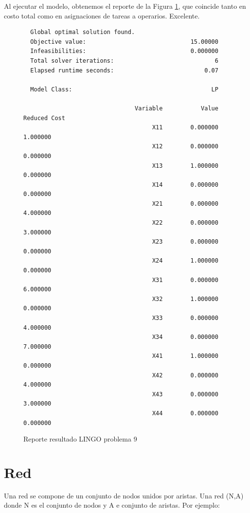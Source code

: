 \documentclass[12pt]{article}  %
\begin{document}
Al ejecutar el modelo, obtenemos el reporte de la Figura \ref{fig:reporteProb9}, que coincide tanto en costo total como en asignaciones de tareas a operarios. Excelente.

\begin{figure}[H]
	\centering
	\caption{Reporte resultado LINGO problema 9}
	\label{fig:reporteProb9}
	\begin{verbatim}
  Global optimal solution found.
  Objective value:                              15.00000
  Infeasibilities:                              0.000000
  Total solver iterations:                             6
  Elapsed runtime seconds:                          0.07

  Model Class:                                        LP

                                Variable           Value        Reduced Cost
                                     X11        0.000000            1.000000
                                     X12        0.000000            0.000000
                                     X13        1.000000            0.000000
                                     X14        0.000000            0.000000
                                     X21        0.000000            4.000000
                                     X22        0.000000            3.000000
                                     X23        0.000000            0.000000
                                     X24        1.000000            0.000000
                                     X31        0.000000            6.000000
                                     X32        1.000000            0.000000
                                     X33        0.000000            4.000000
                                     X34        0.000000            7.000000
                                     X41        1.000000            0.000000
                                     X42        0.000000            4.000000
                                     X43        0.000000            3.000000
                                     X44        0.000000            0.000000
	\end{verbatim}
\end{figure}

\section{Red}
Una red se compone de un conjunto de nodos unidos por aristas. Una red (N,A) donde N es el conjunto de nodos y A e conjunto de aristas. Por ejemplo:
\end{document}
